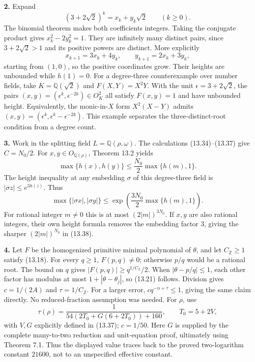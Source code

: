 \documentclass[
  11pt,
  a4paper,
]{article}
\begin{document}
\textbf{2.} Expand \[
(3+2\sqrt2)^k=x_k+y_k\sqrt2\qquad(k\ge0).
\tag{13.43}
\] The binomial theorem makes both coefficients integers. Taking the
conjugate product gives \(x_k^2-2y_k^2=1\). They are infinitely many
distinct pairs, since \(3+2\sqrt2>1\) and its positive powers are
distinct. More explicitly \[
x_{k+1}=3x_k+4y_k,\qquad y_{k+1}=2x_k+3y_k,
\] starting from \((1,0)\), so the positive coordinates grow. Their
heights are unbounded while \(h(1)=0\). For a degree-three
counterexample over number fields, take \(K=\mathbb Q(\sqrt2)\) and
\(F(X,Y)=X^2Y\). With the unit \(\epsilon=3+2\sqrt2\), the pairs
\((x,y)=(\epsilon^k,\epsilon^{-2k})\in O_K^2\) all satisfy \(F(x,y)=1\)
and have unbounded height. Equivalently, the monic-in-\(X\) form
\(X^2(X-Y)\) admits \((x,y)=(\epsilon^k,\epsilon^k-\epsilon^{-2k})\).
This example separates the three-distinct-root condition from a degree
count.

\textbf{3.} Work in the splitting field \(L=\mathbb Q(\rho,\omega)\).
The calculations (13.34)--(13.37) give \(C=N_0/2\). For
\(x,y\in O_{\mathbb Q(\rho)}\), Theorem 13.2 yields \[
\max\{h(x),h(y)\}\le\frac{N_0}{2}\max\{h(m),1\}.
\tag{13.44}
\] The height inequality at any embedding \(\sigma\) of this
degree-three field is \(|\sigma z|\le e^{3h(z)}\). Thus \[
\max\{|\sigma x|,|\sigma y|\}
\le\exp\!\left(\frac{3N_0}{2}\max\{h(m),1\}\right).
\tag{13.45}
\] For rational integer \(m\ne0\) this is at most \((2|m|)^{3N_0}\). If
\(x,y\) are also rational integers, their own height formula removes the
embedding factor \(3\), giving the sharper \((2|m|)^{N_0}\) in (13.38).

\textbf{4.} Let \(F\) be the homogenized primitive minimal polynomial of
\(\theta\), and let \(C_{\mathbb Z}\ge1\) satisfy (13.18). For every
\(q\ge1\), \(F(p,q)\ne0\); otherwise \(p/q\) would be a rational root.
The bound on \(q\) gives \(|F(p,q)|\ge q^{1/C_{\mathbb Z}}/2\). When
\(|\theta-p/q|\le1\), each other factor has modulus at most
\(1+|\theta-\theta_j|\), so (13.21) follows. Division gives \(c=1/(2A)\)
and \(\tau=1/C_{\mathbb Z}\). For a larger error, \(c q^{-n+\tau}\le1\),
giving the same claim directly. No reduced-fraction assumption was
needed. For \(\rho\), use \[
\tau(\rho)=\frac1{54(2T_0+G(6+2T_0))+160},\qquad
T_0=5+2V,
\tag{13.46}
\] with \(V,G\) explicitly defined in (13.37); \(c=1/50\). Here \(G\) is
supplied by the complete many-to-two reduction and unit-equation proof,
ultimately using Theorem 7.1. Thus the displayed value traces back to
the proved two-logarithm constant \(21600\), not to an unspecified
effective constant.
\end{document}
